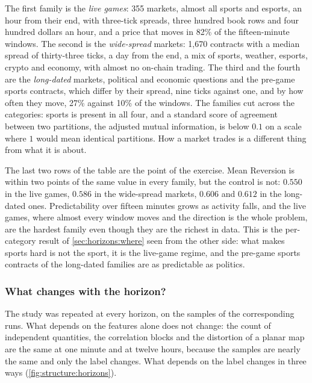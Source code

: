 The first family is the \emph{live games}: 355 markets, almost all sports and esports, an
hour from their end, with three-tick spreads, three hundred book rows and four hundred
dollars an hour, and a price that moves in 82\% of the fifteen-minute windows.  The second
is the \emph{wide-spread} markets: 1{,}670 contracts with a median spread of thirty-three
ticks, a day from the end, a mix of sports, weather, esports, crypto and economy, with
almost no on-chain trading.  The third and the fourth are the \emph{long-dated} markets,
political and economic questions and the pre-game sports contracts, which differ by their
spread, nine ticks against one, and by how often they move, 27\% against 10\% of the
windows.  The families cut across the categories: sports is present in all four, and a
standard score of agreement between two partitions, the adjusted mutual information, is
below $0.1$ on a scale where $1$ would mean identical partitions.  How a market trades is
a different thing from what it is about.

The last two rows of the table are the point of the exercise.  Mean Reversion is within
two points of the same value in every family, but the control is not: $0.550$ in the live
games, $0.586$ in the wide-spread markets, $0.606$ and $0.612$ in the long-dated ones.
Predictability over fifteen minutes grows as activity falls, and the live games, where
almost every window moves and the direction is the whole problem, are the hardest family
even though they are the richest in data.  This is the per-category result of
\cref{sec:horizons:where} seen from the other side: what makes sports hard is not the
sport, it is the live-game regime, and the pre-game sports contracts of the long-dated
families are as predictable as politics.

\subsubsection{What changes with the horizon?}
\label{sec:structure:horizons}

The study was repeated at every horizon, on the samples of the corresponding runs.  What
depends on the features alone does not change: the count of independent quantities, the
correlation blocks and the distortion of a planar map are the same at one minute and at
twelve hours, because the samples are nearly the same and only the label changes.  What
depends on the label changes in three ways (\cref{fig:structure:horizons}).

